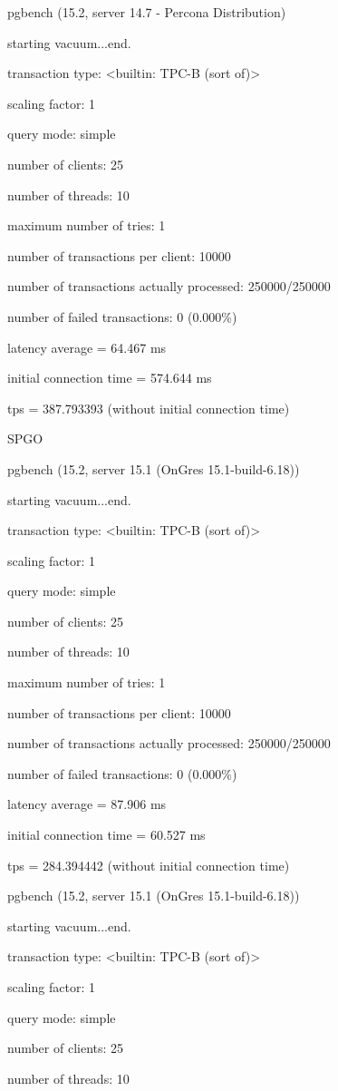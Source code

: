 pgbench (15.2, server 14.7 - Percona Distribution)

starting vacuum...end.

transaction type: <builtin: TPC-B (sort of)>

scaling factor: 1

query mode: simple

number of clients: 25

number of threads: 10

maximum number of tries: 1

number of transactions per client: 10000

number of transactions actually processed: 250000/250000

number of failed transactions: 0 (0.000\%)

latency average = 64.467 ms

initial connection time = 574.644 ms

tps = 387.793393 (without initial connection time)

SPGO

pgbench (15.2, server 15.1 (OnGres 15.1-build-6.18))

starting vacuum...end.

transaction type: <builtin: TPC-B (sort of)>

scaling factor: 1

query mode: simple

number of clients: 25

number of threads: 10

maximum number of tries: 1

number of transactions per client: 10000

number of transactions actually processed: 250000/250000

number of failed transactions: 0 (0.000\%)

latency average = 87.906 ms

initial connection time = 60.527 ms

tps = 284.394442 (without initial connection time)

pgbench (15.2, server 15.1 (OnGres 15.1-build-6.18))

starting vacuum...end.

transaction type: <builtin: TPC-B (sort of)>

scaling factor: 1

query mode: simple

number of clients: 25

number of threads: 10

